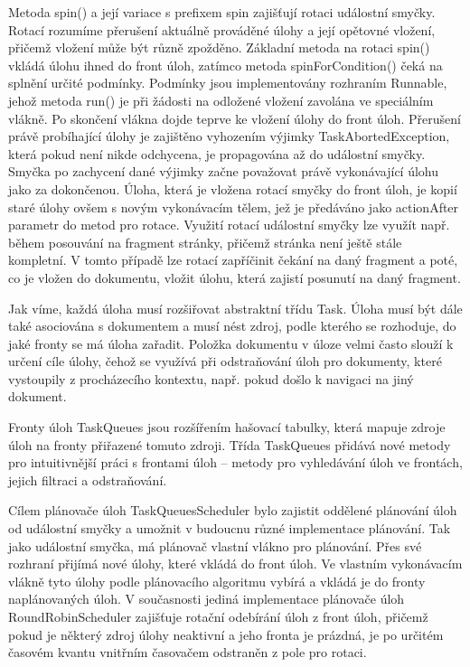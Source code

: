 Metoda spin() a její variace s prefixem spin zajišťují rotaci událostní smyčky. Rotací rozumíme přerušení aktuálně prováděné úlohy a její opětovné vložení, přičemž vložení může být různě zpožděno. Základní metoda na rotaci spin() vkládá úlohu ihned do front úloh, zatímco metoda spinForCondition() čeká na splnění určité podmínky. Podmínky jsou implementovány rozhraním Runnable, jehož metoda run() je při žádosti na odložené vložení zavolána ve speciálním vlákně. Po skončení vlákna dojde teprve ke vložení úlohy do front úloh. Přerušení právě probíhající úlohy je zajištěno vyhozením výjimky TaskAbortedException, která pokud není nikde odchycena, je propagována až do událostní smyčky. Smyčka po zachycení dané výjimky začne považovat právě vykonávající úlohu jako za dokončenou. Úloha, která je vložena rotací smyčky do front úloh, je kopií staré úlohy ovšem s novým vykonávacím tělem, jež je předáváno jako actionAfter parametr do metod pro rotace. Využití rotací událostní smyčky lze využít např. během posouvání na fragment stránky, přičemž stránka není ještě stále kompletní. V tomto případě lze rotací zapříčinit čekání na daný fragment a poté, co je vložen do dokumentu, vložit úlohu, která zajistí posunutí na daný fragment.

Jak víme, každá úloha musí rozšiřovat abstraktní třídu Task. Úloha musí být dále také asociována s dokumentem a musí nést zdroj, podle kterého se rozhoduje, do jaké fronty se má úloha zařadit. Položka dokumentu v úloze velmi často slouží k určení cíle úlohy, čehož se využívá při odstraňování úloh pro dokumenty, které vystoupily z procházecího kontextu, např. pokud došlo k navigaci na jiný dokument. 

Fronty úloh TaskQueues jsou rozšířením hašovací tabulky, která mapuje zdroje úloh na fronty přiřazené tomuto zdroji. Třída TaskQueues přidává nové metody pro intuitivnější práci s frontami úloh -- metody pro vyhledávání úloh ve frontách, jejich filtraci a odstraňování.

Cílem plánovače úloh TaskQueuesScheduler bylo zajistit oddělené plánování úloh od událostní smyčky a umožnit v budoucnu různé implementace plánování. Tak jako událostní smyčka, má plánovač vlastní vlákno pro plánování. Přes své rozhraní přijímá nové úlohy, které vkládá do front úloh. Ve vlastním vykonávacím vlákně tyto úlohy podle plánovacího algoritmu vybírá a vkládá je do fronty naplánovaných úloh. V současnosti jediná implementace plánovače úloh RoundRobinScheduler zajišťuje rotační odebírání úloh z front úloh, přičemž pokud je některý zdroj úlohy neaktivní a jeho fronta je prázdná, je po určitém časovém kvantu vnitřním časovačem odstraněn z pole pro rotaci.

